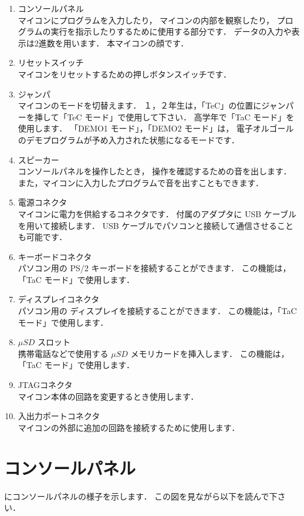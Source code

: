 \begin{enumerate}
\item コンソールパネル \\
マイコンにプログラムを入力したり，
マイコンの内部を観察したり，
プログラムの実行を指示したりするために使用する部分です．
データの入力や表示は2進数を用います．
本マイコンの顔です．
\item リセットスイッチ \\
マイコンをリセットするための押しボタンスイッチです．
\item ジャンパ \\
マイコンのモードを切替えます．
１，２年生は，「TeC」の位置にジャンパーを挿して「TeC モード」で使用して下さい．
高学年で「TaC モード」を使用します．
「DEMO1 モード」，「DEMO2 モード」は，
電子オルゴールのデモプログラムが予め入力された状態になるモードです．
\item スピーカー \\
コンソールパネルを操作したとき，
操作を確認するための音を出します．
また，マイコンに入力したプログラムで音を出すこともできます．
\item 電源コネクタ \\
マイコンに電力を供給するコネクタです．
付属のアダプタに USB ケーブルを用いて接続します．
USB ケーブルでパソコンと接続して通信させることも可能です．
\item キーボードコネクタ \\
パソコン用の PS/2 キーボードを接続することができます．
この機能は，「TaC モード」で使用します．
\item ディスプレイコネクタ \\
パソコン用の ディスプレイを接続することができます．
この機能は，「TaC モード」で使用します．
\item $\mu SD$ スロット \\
携帯電話などで使用する $\mu SD$ メモリカードを挿入します．
この機能は，「TaC モード」で使用します．
\item JTAGコネクタ \\
マイコン本体の回路を変更するとき使用します．
\item 入出力ポートコネクタ \\
マイコンの外部に追加の回路を接続するために使用します．
\end{enumerate}


\section{コンソールパネル}
にコンソールパネルの様子を示します．
この図を見ながら以下を読んで下さい．

